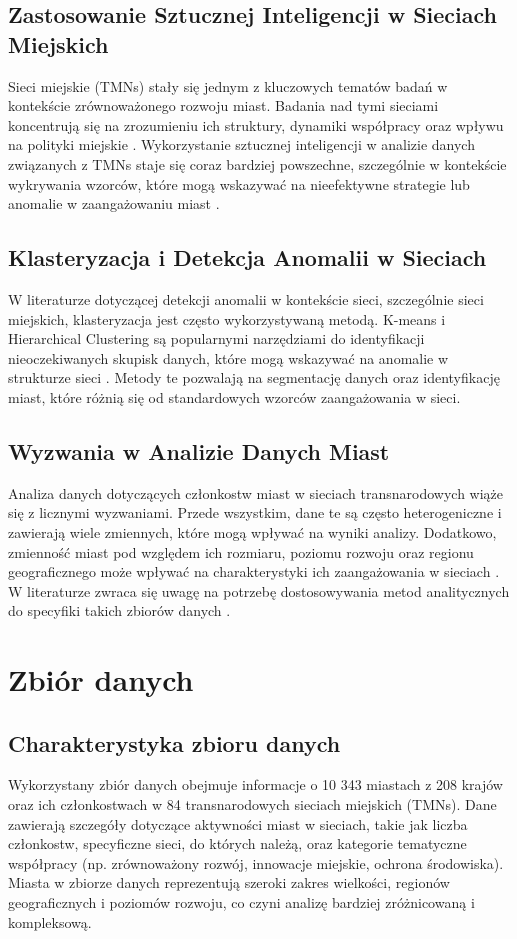 \documentclass[a4paper,fleqn]{cas-dc}
\begin{document}
\subsection{Zastosowanie Sztucznej Inteligencji w Sieciach Miejskich} Sieci miejskie (TMNs) stały się jednym z kluczowych tematów badań w kontekście zrównoważonego rozwoju miast. Badania nad tymi sieciami koncentrują się na zrozumieniu ich struktury, dynamiki współpracy oraz wpływu na polityki miejskie \citep{Mossberger2013}. Wykorzystanie sztucznej inteligencji w analizie danych związanych z TMNs staje się coraz bardziej powszechne, szczególnie w kontekście wykrywania wzorców, które mogą wskazywać na nieefektywne strategie lub anomalie w zaangażowaniu miast \citep{Benk2019}.

\subsection{Klasteryzacja i Detekcja Anomalii w Sieciach} W literaturze dotyczącej detekcji anomalii w kontekście sieci, szczególnie sieci miejskich, klasteryzacja jest często wykorzystywaną metodą. K-means i Hierarchical Clustering są popularnymi narzędziami do identyfikacji nieoczekiwanych skupisk danych, które mogą wskazywać na anomalie w strukturze sieci \citep{Jain2010}. Metody te pozwalają na segmentację danych oraz identyfikację miast, które różnią się od standardowych wzorców zaangażowania w sieci.

\subsection{Wyzwania w Analizie Danych Miast} Analiza danych dotyczących członkostw miast w sieciach transnarodowych wiąże się z licznymi wyzwaniami. Przede wszystkim, dane te są często heterogeniczne i zawierają wiele zmiennych, które mogą wpływać na wyniki analizy. Dodatkowo, zmienność miast pod względem ich rozmiaru, poziomu rozwoju oraz regionu geograficznego może wpływać na charakterystyki ich zaangażowania w sieciach \citep{Roth2015}. W literaturze zwraca się uwagę na potrzebę dostosowywania metod analitycznych do specyfiki takich zbiorów danych \citep{Wasserman2020}.

\section{Zbiór danych}
\subsection{Charakterystyka zbioru danych}
Wykorzystany zbiór danych obejmuje informacje o 10 343 miastach z 208 krajów oraz ich członkostwach w 84 transnarodowych sieciach miejskich (TMNs). Dane zawierają szczegóły dotyczące aktywności miast w sieciach, takie jak liczba członkostw, specyficzne sieci, do których należą, oraz kategorie tematyczne współpracy (np. zrównoważony rozwój, innowacje miejskie, ochrona środowiska). Miasta w zbiorze danych reprezentują szeroki zakres wielkości, regionów geograficznych i poziomów rozwoju, co czyni analizę bardziej zróżnicowaną i kompleksową.
\end{document}
